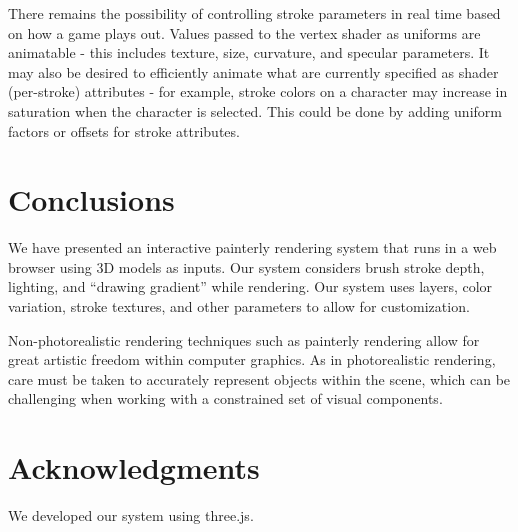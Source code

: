 \documentclass[conference]{acmsiggraph}
\begin{document}
There remains the possibility of controlling stroke parameters in real time
based on how a game plays out. Values passed to the vertex shader as uniforms
are animatable - this includes texture, size, curvature, and specular
parameters. It may also be desired to efficiently animate what are currently
specified as shader (per-stroke) attributes - for example, stroke colors on a
character may increase in saturation when the character is selected. This could
be done by adding uniform factors or offsets for stroke attributes.


\section{Conclusions}

We have presented an interactive painterly rendering system that runs in a web
browser using 3D models as inputs. Our system considers brush stroke depth,
lighting, and ``drawing gradient'' while rendering. Our system uses layers,
color variation, stroke textures, and other parameters to allow for
customization.

Non-photorealistic rendering techniques such as painterly rendering allow for
great artistic freedom within computer graphics. As in photorealistic
rendering, care must be taken to accurately represent objects within the scene,
which can be challenging when working with a constrained set of visual
components.

\section*{Acknowledgments}

We developed our system using three.js.



\end{document}
